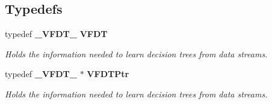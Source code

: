 \subsection*{Typedefs}
\begin{CompactItemize}
\item 
typedef {\bf \_\-VFDT\_\-} {\bf VFDT}
\begin{CompactList}\small\item\em Holds the information needed to learn decision trees from data streams. \item\end{CompactList}\item 
typedef {\bf \_\-VFDT\_\-} $\ast$ {\bf VFDTPtr}
\begin{CompactList}\small\item\em Holds the information needed to learn decision trees from data streams. \item\end{CompactList}\end{CompactItemize}
